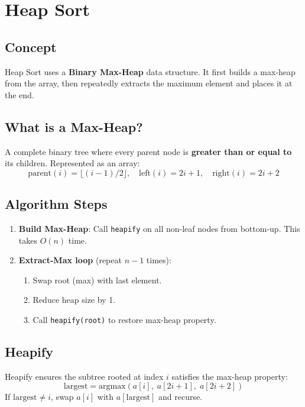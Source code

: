 \documentclass[12pt,a4paper]{article}
\begin{document}
\newpage

\section{Heap Sort}

\subsection{Concept}
Heap Sort uses a \textbf{Binary Max-Heap} data structure. It first builds a max-heap from the array, then repeatedly extracts the maximum element and places it at the end.

\subsection{What is a Max-Heap?}
A complete binary tree where every parent node is \textbf{greater than or equal to} its children. Represented as an array:
\[
\text{parent}(i) = \lfloor (i-1)/2 \rfloor, \quad \text{left}(i) = 2i+1, \quad \text{right}(i) = 2i+2
\]

\subsection{Algorithm Steps}
\begin{enumerate}
    \item \textbf{Build Max-Heap}: Call \texttt{heapify} on all non-leaf nodes from bottom-up.
          This takes $O(n)$ time.
    \item \textbf{Extract-Max loop} (repeat $n-1$ times):
    \begin{enumerate}
        \item Swap root (max) with last element.
        \item Reduce heap size by 1.
        \item Call \texttt{heapify(root)} to restore max-heap property.
    \end{enumerate}
\end{enumerate}

\subsection{Heapify}
Heapify ensures the subtree rooted at index $i$ satisfies the max-heap property:
\[
\text{largest} = \text{argmax}(a[i],\; a[2i+1],\; a[2i+2])
\]
If $\text{largest} \ne i$, swap $a[i]$ with $a[\text{largest}]$ and recurse.
\end{document}
